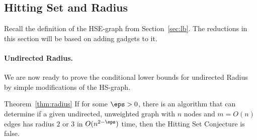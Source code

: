 

\subsection{Hitting Set and Radius }

Recall the definition of the HSE-graph from Section~\ref{sec:lb}. 
The reductions in this section will be based on adding gadgets to it.


\paragraph{Undirected Radius.} We are now ready to prove the conditional lower bounds for undirected Radius by simple modifications of the HS-graph.

\begin{reminder}{Theorem~\ref{thm:radius}}
If for some $\eps>0$, there is an algorithm that can determine if a given undirected, unweighted graph with $n$ nodes and $m=O(n)$ edges has radius $2$ or $3$ in $O(n^{2-\eps})$ time, then the Hitting Set Conjecture is false.
\end{reminder}

